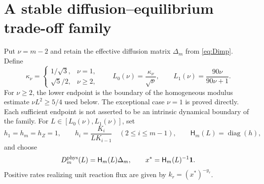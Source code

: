 \documentclass[11pt]{article}
\theoremstyle{definition}
\newcommand{\diag}{\operatorname{diag}}
\newcommand{\1}{\mathbf 1}
\begin{document}
\section{A stable diffusion--equilibrium trade-off family}

Put $\nu=m-2$ and retain the effective diffusion matrix $\Delta_m$ from
\eqref{eq:Dimp}.  Define
\begin{equation}\label{eq:Lrange}
 \kappa_\nu=\begin{cases}
 1/\sqrt3,&\nu=1,\\
 \sqrt5/2,&\nu\ge2,
 \end{cases}
 \qquad L_0(\nu)=\frac{\kappa_\nu}{\sqrt\nu},\qquad
 L_1(\nu)=\frac{90\nu}{90\nu+1}.
\end{equation}
For $\nu\ge2$, the lower endpoint is the boundary of the homogeneous modulus
estimate $\nu L^2\ge5/4$ used below.  The exceptional case $\nu=1$ is proved
directly.  Each sufficient endpoint is not asserted to be an intrinsic
dynamical boundary of the family.
For $L\in[L_0(\nu),L_1(\nu)]$, set
\begin{equation}\label{eq:HL}
 h_1=h_m=h_Z=1,\qquad
 h_i=\frac{K_i}{LK_{i-1}}\quad(2\le i\le m-1),
 \qquad \mathsf H_m(L)=\diag(h),
\end{equation}
and choose
\begin{equation}\label{eq:Dphys}
 D_m^{\rm phys}(L)=\mathsf H_m(L)\Delta_m,
 \qquad x^*=\mathsf H_m(L)^{-1}\1.
\end{equation}
Positive rates realizing unit reaction flux are given by
$k_r=(x^*)^{-y_r}$.
\end{document}
